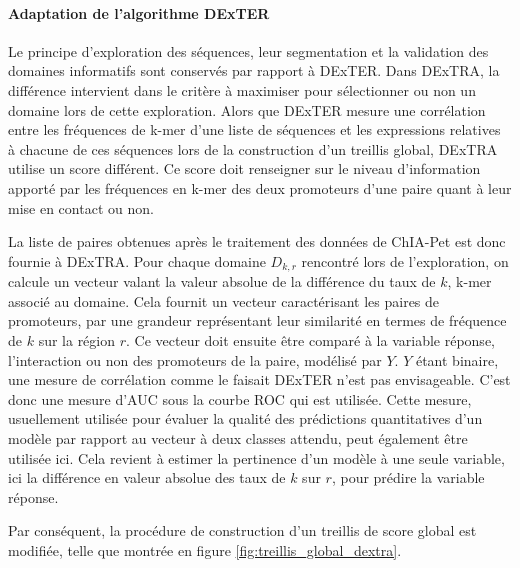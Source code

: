 \documentclass[french]{llncs}
\begin{document}
\paragraph{Adaptation de l'algorithme DExTER}

Le principe d'exploration des séquences, leur segmentation et la validation des domaines informatifs sont conservés par rapport à DExTER. Dans DExTRA, la différence intervient dans le critère à maximiser pour sélectionner ou non un domaine lors de cette exploration. Alors que DExTER mesure une corrélation entre les fréquences de k-mer d'une liste de séquences et les expressions relatives à chacune de ces séquences lors de la construction d'un treillis global, DExTRA utilise un score différent. Ce score doit renseigner sur le niveau d'information apporté par les fréquences en k-mer des deux promoteurs d'une paire quant à leur mise en contact ou non.

La liste de paires obtenues après le traitement des données de ChIA-Pet est donc fournie à DExTRA. Pour chaque domaine $D_{k,r}$ rencontré lors de l'exploration, on calcule un vecteur valant la valeur absolue de la différence du taux de $k$, k-mer associé au domaine. Cela fournit un vecteur caractérisant les paires de promoteurs, par une grandeur représentant leur similarité en termes de fréquence de $k$ sur la région $r$. Ce vecteur doit ensuite être comparé à la variable réponse, l'interaction ou non des promoteurs de la paire, modélisé par $Y$. $Y$ étant binaire, une mesure de corrélation comme le faisait DExTER n'est pas envisageable. C'est donc une mesure d'AUC sous la courbe ROC qui est utilisée. Cette mesure, usuellement utilisée pour évaluer la qualité des prédictions quantitatives d'un modèle par rapport au vecteur à deux classes attendu, peut également être utilisée ici. Cela revient à estimer la pertinence d'un modèle à une seule variable, ici la différence en valeur absolue des taux de $k$ sur $r$, pour prédire la variable réponse.

Par conséquent, la procédure de construction d'un treillis de score global est modifiée, telle que montrée en figure \ref{fig:treillis_global_dextra}.
\end{document}
